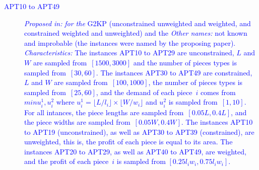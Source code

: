 \documentclass[ppgc,tese,english,formais,babel]{iiufrgs}
\newif\iffinalversion
\newcommand{\newtext}[1]{\iffinalversion%
#1%
\else%
\textcolor{blue}{#1}%
\fi%
}
\begin{document}
\begin{description}
\item [\newtext{APT10 to APT49}] \newtext{\emph{Proposed in:} \citet{alvarez:2002:tabu} \emph{for the} G2KP (unconstrained unweighted and weighted, and constrained weighted and unweighted) and the \emph{Other names:} not known and improbable (the instances were named by the proposing paper). \emph{Characteristics:} The instances APT10 to APT29 are unconstrained, \(L\) and \(W\) are sampled from~\([1500, 3000]\) and the number of pieces types is sampled from~\([30, 60]\). The instances APT30 to APT49 are constrained, \(L\) and \(W\) are sampled from~\([100, 1000]\), the number of pieces types is sampled from~\([25, 60]\), and the demand of each piece~\(i\) comes from~\(min{u^1_i, u^2_i}\) where \(u^1_i = \lfloor L / l_i \rfloor \times \lfloor W / w_i \rfloor\) and \(u^2_i\) is sampled from~\([1, 10]\). For all intances, the piece lengths are sampled from~\([0.05L, 0.4L]\), and the piece widths are sampled from~\([0.05W, 0.4W]\). The instances APT10 to APT19 (unconstrained), as well as APT30 to APT39 (constrained), are unweighted, this is, the profit of each piece is equal to its area. The instances APT20 to APT29, as well as APT40 to APT49, are weighted, and the profit of each piece~\(i\) is sampled from \([0.25l_iw_i, 0.75l_iw_i]\).}

\end{description}
\end{document}
